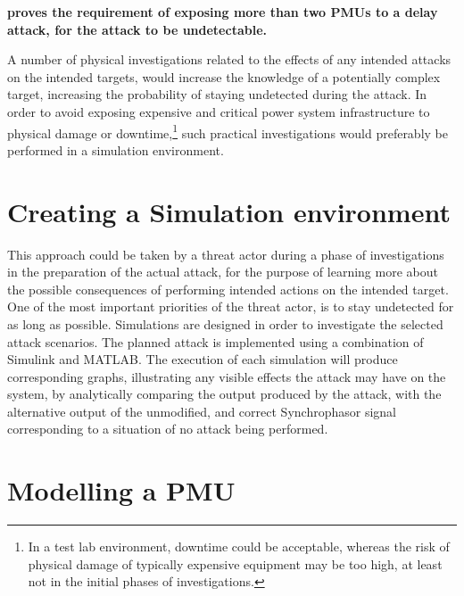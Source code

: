 \textbf{\cite{barreto2016undetectable} proves the requirement of exposing more than two PMUs to a delay attack, for the attack to be undetectable.}




A number of physical investigations related to the effects of any intended attacks on the intended targets, would increase the knowledge of a potentially complex target, increasing the probability of staying undetected during the attack. In order to avoid exposing expensive and critical power system infrastructure to physical damage or downtime,\footnote{In a test lab environment, downtime could be acceptable, whereas the risk of physical damage of typically expensive equipment may be too high, at least not in the initial phases of investigations.} such practical investigations would preferably be performed in a simulation environment.

\section{Creating a Simulation environment}

This approach could be taken by a threat actor during a phase of investigations in the preparation of the actual attack, for the purpose of learning more about the possible consequences of performing intended actions on the intended target. One of the most important priorities of the threat actor, is to stay undetected for as long as possible. Simulations are designed in order to investigate the selected attack scenarios. The planned attack is implemented using a combination of Simulink and MATLAB. The execution of each simulation will produce corresponding graphs, illustrating any visible effects the attack may have on the system, by analytically comparing the output produced by the attack, with the alternative output of the unmodified, and correct Synchrophasor signal corresponding to  a situation of no attack being performed.

\section{Modelling a PMU}

